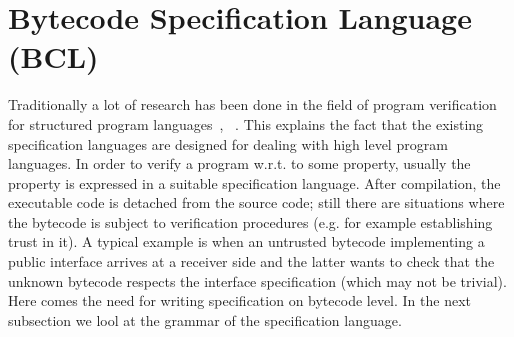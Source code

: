 
\section{Bytecode Specification Language (BCL)}\label{bcSpecLg}
Traditionally a lot of research has been done in the field of program verification for structured program languages~\cite{WPCDS},
~\cite{DisDij}. This explains the fact that the existing specification languages are designed for dealing with high level program languages. In order to verify 
a program w.r.t. to some property, usually the property is expressed in a suitable specification language.
After compilation, the executable code is detached from the source code; still there are situations where the bytecode is subject to verification procedures (e.g. for example establishing trust in it). A typical example is when an untrusted bytecode implementing a public interface arrives at a 
receiver side and the latter wants to check that the unknown  bytecode respects the interface specification (which may not be trivial). Here comes the need for writing specification on  bytecode level. In the next subsection we lool at the grammar of the specification language.

